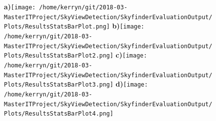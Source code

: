 \documentclass{article}
\begin{document}
\clearpage

\begin{figure}
\centering 
\textbf{\scriptsize{a)}}\texttt{[image: /home/kerryn/git/2018-03-MasterITProject/SkyViewDetection/SkyfinderEvaluationOutput/Plots/ResultsStatsBarPlot.png]}
\textbf{\scriptsize{b)}}\texttt{[image: /home/kerryn/git/2018-03-MasterITProject/SkyViewDetection/SkyfinderEvaluationOutput/Plots/ResultsStatsBarPlot2.png]}
\textbf{\scriptsize{c)}}\texttt{[image: /home/kerryn/git/2018-03-MasterITProject/SkyViewDetection/SkyfinderEvaluationOutput/Plots/ResultsStatsBarPlot3.png]} 
\textbf{\scriptsize{d)}}\texttt{[image: /home/kerryn/git/2018-03-MasterITProject/SkyViewDetection/SkyfinderEvaluationOutput/Plots/ResultsStatsBarPlot4.png]}

\end{figure} 



\clearpage
\end{document}
